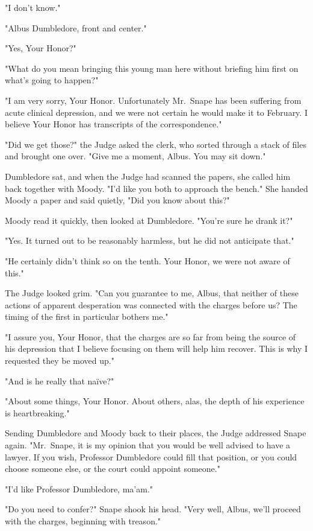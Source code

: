 "I don't know."

"Albus Dumbledore, front and center."

"Yes, Your Honor?"

"What do you mean bringing this young man here without briefing him first on what's going to happen?"

"I am very sorry, Your Honor. Unfortunately Mr.~Snape has been suffering from acute clinical depression, and we were not certain he would make it to February. I believe Your Honor has transcripts of the correspondence."

"Did we get those?" the Judge asked the clerk, who sorted through a stack of files and brought one over. "Give me a moment, Albus. You may sit down."

Dumbledore sat, and when the Judge had scanned the papers, she called him back together with Moody. "I'd like you both to approach the bench." She handed Moody a paper and said quietly, "Did you know about this?"

Moody read it quickly, then looked at Dumbledore. "You're sure he drank it?"

"Yes. It turned out to be reasonably harmless, but he did not anticipate that."

"He certainly didn't think so on the tenth. Your Honor, we were not aware of this."

The Judge looked grim. "Can you guarantee to me, Albus, that neither of these actions of apparent desperation was connected with the charges before us? The timing of the first in particular bothers me."

"I assure you, Your Honor, that the charges are so far from being the source of his depression that I believe focusing on them will help him recover. This is why I requested they be moved up."

"And is he really that naïve?"

"About some things, Your Honor. About others, alas, the depth of his experience is heartbreaking."

Sending Dumbledore and Moody back to their places, the Judge addressed Snape again. "Mr.~Snape, it is my opinion that you would be well advised to have a lawyer. If you wish, Professor Dumbledore could fill that position, or you could choose someone else, or the court could appoint someone."

"I'd like Professor Dumbledore, ma'am."

"Do you need to confer?" Snape shook his head. "Very well, Albus, we'll proceed with the charges, beginning with treason."

